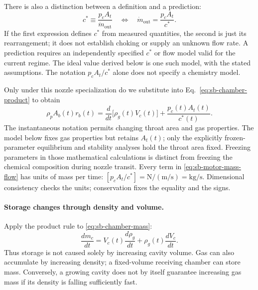 There is also a distinction between a definition and a prediction:
\[
 c^*\equiv\frac{p_cA_t}{\dot m_{\mathrm{out}}}
 \quad\Longleftrightarrow\quad
 \dot m_{\mathrm{out}}=\frac{p_cA_t}{c^*}.
\]
If the first expression defines $c^*$ from measured quantities,
the second is just its rearrangement; it does not establish choking
or supply an unknown flow rate. A prediction requires an independently
specified $c^*$ or flow model valid for the current regime. The ideal
value derived below is one such model, with the stated assumptions.
The notation $p_cA_t/c^*$ alone does not specify a chemistry model.

Only under this nozzle specialization do we substitute into
Eq.~\eqref{eq:sb-chamber-product} to obtain
\begin{equation}\label{eq:sb-motor-mass-flow}
 \boxed{\rho_p A_b(t)r_b(t)
 =\frac{d}{dt}\bigl[\rho_g(t)V_c(t)\bigr]
  +\frac{p_c(t)A_t(t)}{c^*(t)}.}
\end{equation}
The instantaneous notation permits changing throat area and gas
properties. The model below fixes gas properties but retains $A_t(t)$;
only the explicitly frozen-parameter equilibrium and stability analyses
hold the throat area fixed. Freezing parameters in those mathematical
calculations is distinct from freezing the chemical composition
during nozzle transit.
Every term in \eqref{eq:sb-motor-mass-flow} has units of mass per time:
$[p_cA_t/c^*]=\mathrm N/(\mathrm m/\mathrm s)=\mathrm{kg}/\mathrm s$.
Dimensional consistency checks the units; conservation fixes the
equality and the signs.


\paragraph{Storage changes through density and volume.}
Apply the product rule to \eqref{eq:sb-chamber-mass}:
\begin{equation}\label{eq:sb-storage-product-rule}
 \frac{dm_c}{dt}
 =V_c(t)\frac{d\rho_g}{dt}+\rho_g(t)\frac{dV_c}{dt}.
\end{equation}
Thus storage is not caused solely by increasing cavity volume.
Gas can also accumulate by increasing density; a fixed-volume receiving
chamber can store mass. Conversely, a growing cavity does not by itself
guarantee increasing gas mass if its density is falling sufficiently fast.


